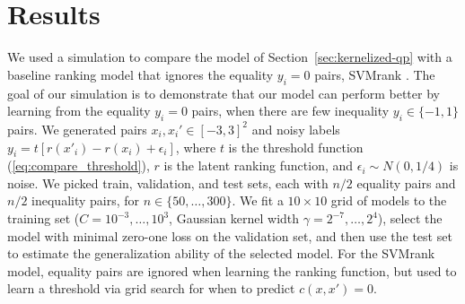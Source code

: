 \documentclass{article}
\begin{document}







  


\section{Results}
\label{sec:results}

We used a simulation to compare the model of
Section~\ref{sec:kernelized-qp} with a baseline ranking model that
ignores the equality $y_i=0$ pairs, SVMrank \citep{ranksvm}. The goal
of our simulation is to demonstrate that our model can perform better
by learning from the equality $y_i=0$ pairs, when there are few
inequality $y_i\in\{-1,1\}$ pairs. We generated pairs
$x_i,x_i'\in[-3,3]^2$ and noisy labels
$y_i=t[r(x'_i)-r(x_i)+\epsilon_i]$, where $t$ is the threshold
function (\ref{eq:compare_threshold}), $r$ is the latent ranking
function, and $\epsilon_i\sim N(0, 1/4)$ is noise. We picked train,
validation, and test sets, each with $n/2$ equality pairs and $n/2$
inequality pairs, for $n\in\{50,\dots,300\}$. We fit a $10\times 10$
grid of models to the training set ($C=10^{-3},\dots,10^3$, Gaussian
kernel width $\gamma=2^{-7},\dots,2^4$), select the model with minimal
zero-one loss on the validation set, and then use the test set to
estimate the generalization ability of the selected model. For the
SVMrank model, equality pairs are ignored when learning the ranking
function, but used to learn a threshold via grid search for when to
predict $c(x,x')=0$.
\end{document}
